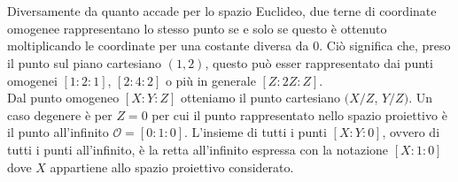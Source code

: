 \documentclass[a4paper,12pt]{tesiinfo}
\begin{document}
\\
\\
Diversamente da quanto accade per lo spazio Euclideo, due terne di coordinate omogenee rappresentano lo stesso punto se e solo se questo \`e ottenuto moltiplicando le coordinate per una costante diversa da 0. Ci\`o significa che, preso il punto sul piano cartesiano $(1, 2)$, questo pu\`o esser rappresentato dai punti omogenei $[1: 2: 1]$, $[2: 4: 2]$ o pi\`u in generale $[Z: 2Z: Z]$.
\\
Dal punto omogeneo $[X: Y: Z]$ otteniamo il punto cartesiano $(X/Z$, $Y/Z)$. Un caso degenere \`e per $Z=0$ per cui il punto rappresentato nello spazio proiettivo \`e il punto all'infinito $\mathcal{O} = [0: 1: 0]$. L'insieme di tutti i punti $[X: Y: 0]$, ovvero di tutti i punti all'infinito, \`e la retta all'infinito espressa con la notazione $[X:1:0]$ dove $X$ appartiene allo spazio proiettivo considerato. 
\\
\\
%
%
%
%
%
%
\end{document}

